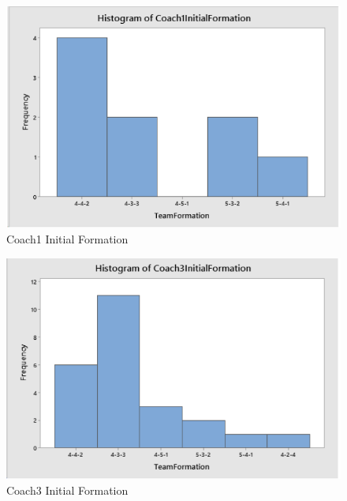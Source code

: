 \documentclass[12pt]{article}
\begin{document}
\begin{figure}[ht]
\begin{center}
\includegraphics[scale=0.5]{images/Screen Shot 2020-02-17 at 8.29.06 PM.png}
\caption{Coach1 Initial Formation}
\end{center}
\end{figure}
\begin{figure}[ht]
\begin{center}
\includegraphics[scale=0.5]{images/Screen Shot 2020-02-17 at 8.29.11 PM.png}
\caption{Coach3 Initial Formation}
\end{center}
\end{figure}
\end{document}

